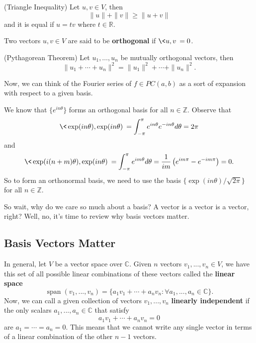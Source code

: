 \begin{lem}{(Triangle Inequality)}
Let $u,v\in V$, then
\begin{equation}
\|u\| + \|v\|\geq \|u+v\|
\end{equation}
and it is equal if $u=tv$ where $t\in\mathbb{R}$.
\end{lem}
\begin{defn}
Two vectors $u,v\in V$ are said to be \textbf{orthogonal}
if $\<u,v\>=0$.
\end{defn}
\begin{lem}{(Pythagorean Theorem)}
Let $u_1,\ldots,u_n$ be mutually orthogonal vectors, then
\begin{equation}
\|u_1+\cdots+u_n\|^2 = \|u_1\|^2 + \cdots + \|u_n\|^2.
\end{equation}
\end{lem}
Now, we can think of the Fourier series of $f\in PC(a,b)$ as
a sort of expansion with respect to a given basis.

We know that $\{e^{in\theta}\}$ forms an orthogonal basis
for all $n\in\mathbb{Z}$. Observe that
\begin{equation}
\<\exp(in\theta),\exp(in\theta)\> =
\int^{\pi}_{-\pi}e^{in\theta}e^{-in\theta}d\theta = 2\pi
\end{equation}
and 
\begin{equation}
\<\exp(i(n+m)\theta),\exp(in\theta)\> =
\int^{\pi}_{-\pi}e^{im\theta}d\theta =
\frac{1}{im}\left(e^{im\pi}-e^{-im\pi}\right) = 0.
\end{equation}
So to form an orthonormal basis, we need to use the basis
$\{\exp(in\theta)/\sqrt{2\pi}\}$ for all $n\in\mathbb{Z}$.

So wait, why do we care so much about a basis? A vector is a
vector is a vector, right? Well, no, it's time to review why
basis vectors matter.

\subsection{Basis Vectors Matter}

In general, let $V$ be a vector space over
$\mathbb{C}$. Given $n$ vectors $v_1,...,v_n\in V$, we have
this set of all possible linear combinations of these
vectors called the \textbf{linear space}
\begin{equation}
\operatorname{span}(v_1,...,v_n) =
\{a_1v_1+\cdots+a_nv_n:\forall a_1,...,a_n\in\mathbb{C}\}.
\end{equation}
Now, we can call a given collection of vectors $v_1,...,v_n$
\textbf{linearly independent} if the only scalars
$a_1,...,a_n\in\mathbb{C}$ that satisfy
\begin{equation}
a_1v_1 + \cdots + a_nv_n = 0
\end{equation}
are $a_1=\cdots=a_n=0$. This means that we cannot write any
single vector in terms of a linear combination of the other
$n-1$ vectors.

